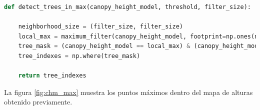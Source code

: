 \vspace{0.2cm}
\begin{lstlisting}[language=Python, caption={Código para la busqueda de máximos }, label=lst:detectT]
def detect_trees_in_max(canopy_height_model, threshold, filter_size):

    neighborhood_size = (filter_size, filter_size)
    local_max = maximum_filter(canopy_height_model, footprint=np.ones(neighborhood_size), mode='constant')
    tree_mask = (canopy_height_model == local_max) & (canopy_height_model > threshold)
    tree_indexes = np.where(tree_mask)
    
    return tree_indexes
\end{lstlisting}

La figura \ref{fig:chm_max} muestra los puntos máximos dentro del mapa de alturas obtenido previamente.

